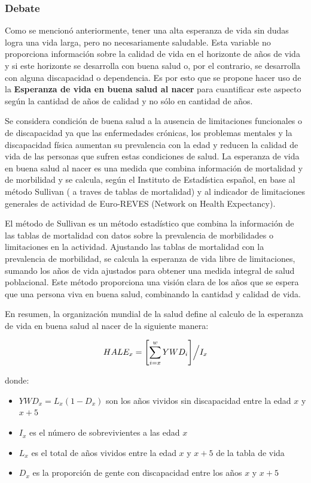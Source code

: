 \documentclass[
  10pt,
]{article}
\begin{document}
\hypertarget{debate}{%
\subsubsection{Debate}\label{debate}}

Como se mencionó anteriormente, tener una alta esperanza de vida sin
dudas logra una vida larga, pero no necesariamente saludable. Esta
variable no proporciona información sobre la calidad de vida en el
horizonte de años de vida y si este horizonte se desarrolla con buena
salud o, por el contrario, se desarrolla con alguna discapacidad o
dependencia. Es por esto que se propone hacer uso de la
\textbf{Esperanza de vida en buena salud al nacer} para cuantificar este
aspecto según la cantidad de años de calidad y no sólo en cantidad de
años.

Se considera condición de buena salud a la ausencia de limitaciones
funcionales o de discapacidad ya que las enfermedades crónicas, los
problemas mentales y la discapacidad física aumentan su prevalencia con
la edad y reducen la calidad de vida de las personas que sufren estas
condiciones de salud. La esperanza de vida en buena salud al nacer es
una medida que combina información de mortalidad y de morbilidad y se
calcula, según el Instituto de Estadística español, en base al método
Sullivan ( a traves de tablas de mortalidad) y al indicador de
limitaciones generales de actividad de Euro-REVES (Network on Health
Expectancy).

El método de Sullivan es un método estadístico que combina la
información de las tablas de mortalidad con datos sobre la prevalencia
de morbilidades o limitaciones en la actividad. Ajustando las tablas de
mortalidad con la prevalencia de morbilidad, se calcula la esperanza de
vida libre de limitaciones, sumando los años de vida ajustados para
obtener una medida integral de salud poblacional. Este método
proporciona una visión clara de los años que se espera que una persona
viva en buena salud, combinando la cantidad y calidad de vida.

En resumen, la organización mundial de la salud define al calculo de la
esperanza de vida en buena salud al nacer de la siguiente manera:

\[HALE_x = \Biggl[\sum_{i=x}^w YWD_i\Biggl] \Bigl/ I_x\]

donde:

\begin{itemize}
\item
  \(YWD_x = L_x (1-D_x)\) son los años vividos sin discapacidad entre la
  edad \(x\) y \(x+5\)
\item
  \(I_x\) es el número de sobrevivientes a las edad \(x\)
\item
  \(L_x\) es el total de años vividos entre la edad \(x\) y \(x+5\) de
  la tabla de vida
\item
  \(D_x\) es la proporción de gente con discapacidad entre los años
  \(x\) y \(x+5\)
\end{itemize}
\end{document}

